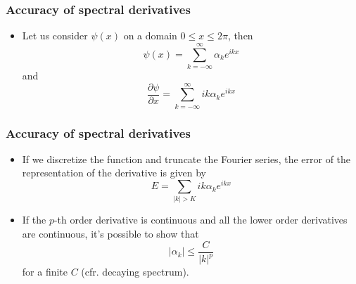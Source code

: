 \documentclass[aspectratio=149,9pt]{beamer}
\begin{document}
%
%
\begin{frame}
	\frametitle{Accuracy of spectral derivatives}
	\vfill\begin{itemize}
		\item Let us consider $\psi(x)$ on a domain $0 \le x \le 2\pi$, then
			\begin{equation*}
				\psi (x) = \sum_{k=-\infty}^{\infty} \alpha_k e^{ik x}
			\end{equation*}
			and 
			\begin{equation*}
				\frac{\partial \psi}{\partial x} = \sum_{k=-\infty}^{\infty} i k \alpha_k e^{i k x}
			\end{equation*}
	\end{itemize}\vfill
\end{frame}
%
%
\begin{frame}
	\frametitle{Accuracy of spectral derivatives}
	\vfill\begin{itemize}
		\item If we discretize the function and truncate the Fourier series, the error of the representation of the derivative is given by
			\begin{equation*}
				E = \sum_{\vert k \vert > K} i k \alpha_k e^{ikx}
			\end{equation*}\vfill
		\item If the $p$-th order derivative is continuous and all the lower order derivatives are continuous, it's possible to show that
			\begin{equation*}
				| \alpha_k | \le \frac{C}{\vert k \vert^p}
			\end{equation*}
			for a finite $C$ (cfr. decaying spectrum).
	\end{itemize}\vfill
\end{frame}
%
%
\end{document}
